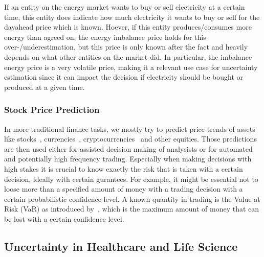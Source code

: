 If an entity on the energy market wants to buy or sell electricity at a certain time, this entity does indicate how much electricity it wants to buy or sell for the dayahead price which is known. Hoever, if this entity produces/consumes more energy than agreed on, the energy imbalance price holds for this over-/underestimation, but this price is only known after the fact and heavily depends on what other entities on the market did. In particular, the imbalance energy price is a very volatile price, making it a relevant use case for uncertainty estimation since it can impact the decision if electricity should be bought or produced at a given time.

\subsubsection{Stock Price Prediction}
In more traditional finance tasks, we mostly try to predict price-trends of assets like stocks~\cite{singh2017stock}, currencies~\cite{hassanpour2023evaluation}, cryptocurrencies~\cite{alessandretti2018anticipating} and other equities. Those predictions are then used either for assisted decision making of analysists or for automated and potentially high frequency trading. Especially when making decisions with high stakes it is crucial to know exactly the risk that is taken with a certain decision, ideally with certain gurantees. For example, it might be essential not to loose more than a specified amount of money with a trading decision with a certain probabilistic confidence level. A known quantity in trading is the Value at Risk (VaR) as introduced by~\cite{jorion2007value}, which is the maximum amount of money that can be lost with a certain confidence level.

\subsection{Uncertainty in Healthcare and Life Science}

